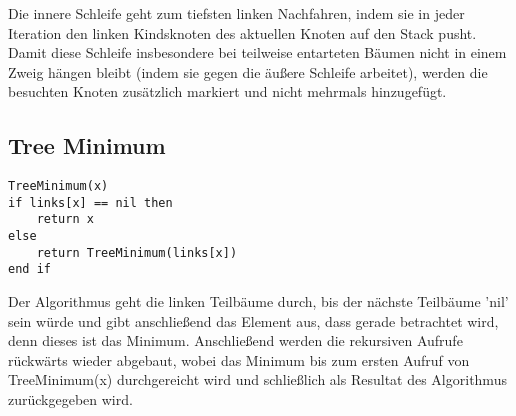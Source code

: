 Die innere Schleife geht zum tiefsten linken Nachfahren, indem sie in jeder Iteration den linken Kindsknoten des aktuellen Knoten auf den Stack pusht. 
Damit diese Schleife insbesondere bei teilweise entarteten Bäumen nicht in einem Zweig hängen bleibt (indem sie gegen die äußere Schleife arbeitet), werden die besuchten Knoten zusätzlich markiert und nicht mehrmals hinzugefügt.



\subsection*{Tree Minimum}
\begin{lstlisting}
TreeMinimum(x)
if links[x] == nil then
    return x
else
    return TreeMinimum(links[x])
end if
\end{lstlisting}
Der Algorithmus geht die linken Teilbäume durch, bis der nächste Teilbäume 'nil' sein würde und gibt anschließend das Element aus, dass gerade betrachtet wird, denn dieses ist das Minimum. Anschließend werden die rekursiven Aufrufe rückwärts wieder abgebaut, wobei das Minimum bis zum ersten Aufruf von TreeMinimum(x) durchgereicht wird und schließlich als Resultat des Algorithmus zurückgegeben wird.
